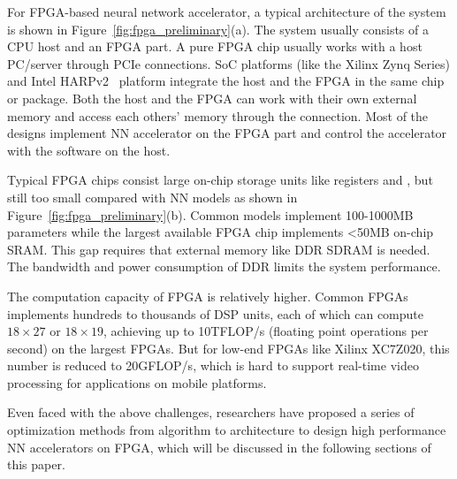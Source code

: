 For FPGA-based neural network accelerator, a typical architecture of the system is shown in Figure~\ref{fig:fpga_preliminary}(a). The system usually consists of a CPU host and an FPGA part. A pure FPGA chip usually works with a host PC/server through PCIe connections. SoC platforms (like the Xilinx Zynq Series) and Intel HARPv2~\cite{gupta2016accelerating} platform integrate the host and the FPGA in the same chip or package. Both the host and the FPGA can work with their own external memory and access each others' memory through the connection. Most of the designs implement NN accelerator on the FPGA part and control the 
accelerator with the software on the host.

Typical FPGA chips consist large on-chip storage units like registers and , but still too small compared with NN models as shown in Figure~\ref{fig:fpga_preliminary}(b). Common models implement 100-1000MB parameters while the largest available FPGA chip implements <50MB on-chip SRAM. This gap requires that external memory like DDR SDRAM is needed. The bandwidth and power consumption of DDR limits the system performance.

The computation capacity of FPGA is relatively higher. Common FPGAs implements hundreds to thousands of DSP units, each of which can compute $18\times 27$ or $18\times 19$, achieving up to 10TFLOP/s (floating point operations per second) on the largest FPGAs. But for low-end FPGAs like Xilinx XC7Z020, this number is reduced to 20GFLOP/s, which is hard to support real-time video processing for applications on mobile platforms. 

Even faced with the above challenges, researchers have proposed a series of optimization methods from algorithm to architecture to design high performance NN accelerators on FPGA, which will be discussed in the following sections of this paper.